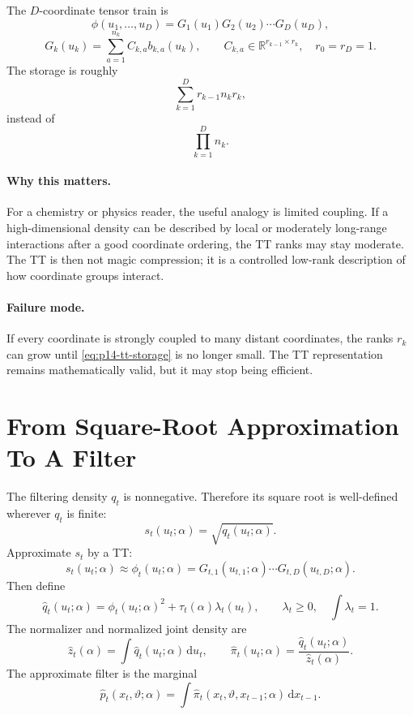 \documentclass[11pt]{article}
\newcommand{\dd}{\mathrm{d}}
\newcommand{\R}{\mathbb{R}}
\renewcommand{\[}{\begin{equation}}
\renewcommand{\]}{\end{equation}}
\theoremstyle{definition}
\theoremstyle{remark}
\begin{document}
The \(D\)-coordinate tensor train is
\[
  \phi(u_1,\ldots,u_D)
  =
  G_1(u_1)G_2(u_2)\cdots G_D(u_D),
  \label{eq:p14-functional-tt}
\]
\[
  G_k(u_k)=\sum_{a=1}^{n_k} C_{k,a}b_{k,a}(u_k),
  \qquad
  C_{k,a}\in\R^{r_{k-1}\times r_k},\quad r_0=r_D=1.
  \label{eq:p14-core-expansion}
\]
The storage is roughly
\[
  \sum_{k=1}^D r_{k-1}n_k r_k,
  \label{eq:p14-tt-storage}
\]
instead of
\[
  \prod_{k=1}^D n_k.
  \label{eq:p14-full-storage}
\]

\paragraph{Why this matters.}
For a chemistry or physics reader, the useful analogy is limited coupling.  If
a high-dimensional density can be described by local or moderately long-range
interactions after a good coordinate ordering, the TT ranks may stay moderate.
The TT is then not magic compression; it is a controlled low-rank description
of how coordinate groups interact.

\paragraph{Failure mode.}
If every coordinate is strongly coupled to many distant coordinates, the ranks
\(r_k\) can grow until \eqref{eq:p14-tt-storage} is no longer small.  The TT
representation remains mathematically valid, but it may stop being efficient.

\section{From Square-Root Approximation To A Filter}

The filtering density \(q_t\) is nonnegative.  Therefore its square root is
well-defined wherever \(q_t\) is finite:
\[
  s_t(u_t;\alpha)=\sqrt{q_t(u_t;\alpha)}.
  \label{eq:p14-root-target}
\]
Approximate \(s_t\) by a TT:
\[
  s_t(u_t;\alpha)\approx
  \phi_t(u_t;\alpha)
  =
  G_{t,1}(u_{t,1};\alpha)\cdots G_{t,D}(u_{t,D};\alpha).
  \label{eq:p14-root-tt}
\]
Then define
\[
  \widehat q_t(u_t;\alpha)
  =
  \phi_t(u_t;\alpha)^2+\tau_t(\alpha)\lambda_t(u_t),
  \qquad
  \lambda_t\ge0,\quad \int\lambda_t=1.
  \label{eq:p14-qhat}
\]
The normalizer and normalized joint density are
\[
  \widehat z_t(\alpha)
  =
  \int\widehat q_t(u_t;\alpha)\,\dd u_t,
  \qquad
  \widehat\pi_t(u_t;\alpha)
  =
  \frac{\widehat q_t(u_t;\alpha)}{\widehat z_t(\alpha)}.
  \label{eq:p14-zhat-pihat}
\]
The approximate filter is the marginal
\[
  \widehat p_t(x_t,\vartheta;\alpha)
  =
  \int
  \widehat\pi_t(x_t,\vartheta,x_{t-1};\alpha)
  \,\dd x_{t-1}.
  \label{eq:p14-pt-from-pihat}
\]
\end{document}
